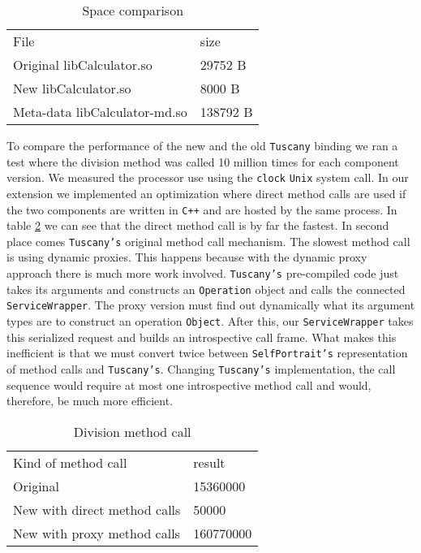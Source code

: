 \begin{table}[ht]
\centering
\caption{Space comparison}
\label{tab:table1}
\begin{tabular}{ll}
\hline\noalign{\smallskip}
File & size\\
\noalign{\smallskip}
\hline
\noalign{\smallskip}
Original libCalculator.so & 29752 B\\
New libCalculator.so & 8000 B\\
Meta-data libCalculator-md.so & 138792 B\\
\hline
\end{tabular}
\end{table}

To compare the performance of the new and the old \texttt{Tuscany} binding we ran a test where the
division method was called 10 million times for each component version. We measured the processor use
using the \texttt{clock} \texttt{Unix} system call. In our extension we implemented an optimization where
direct method calls are used if the two components are written in \texttt{C++} and are hosted by the same
process. In table \ref{tab:table2} we can see that the direct method call is by far the fastest. In second
place comes \texttt{Tuscany's} original method call mechanism. The slowest method call is using dynamic proxies.
This happens because with the dynamic proxy approach there is much more work involved. \texttt{Tuscany's}
pre-compiled code just takes its arguments and constructs an \texttt{Operation} object and calls the connected
\texttt{ServiceWrapper}. The proxy version must find out dynamically what its argument types are to construct
an operation \texttt{Object}. After this, our \texttt{ServiceWrapper} takes this serialized request and
builds an introspective call frame. What makes this inefficient is that we must convert twice between \texttt{SelfPortrait's}
representation of method calls and \texttt{Tuscany's}. Changing \texttt{Tuscany's} implementation, the call sequence would
require at most one introspective method call and would, therefore, be much more efficient.

\begin{table}[ht]
\centering
\caption{Division method call}
\label{tab:table2}
\begin{tabular}{ll}
\hline\noalign{\smallskip}
Kind of method call & result\\
\noalign{\smallskip}
\hline
\noalign{\smallskip}
Original & 15360000\\
New with direct method calls & 50000\\
New with proxy method calls & 160770000\\
\hline
\end{tabular}

\end{table}


